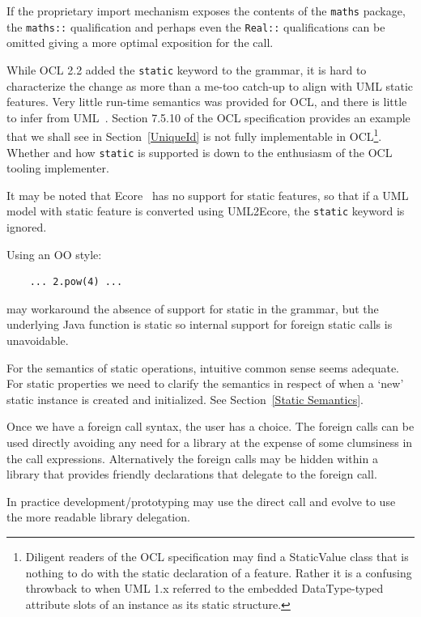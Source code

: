 \documentclass[sigconf]{acmart}
\begin{document}
If the proprietary import mechanism exposes the contents of the \verb|maths| package, the \verb|maths::| qualification and perhaps even the \verb|Real::| qualifications can be omitted giving a more optimal exposition for the call.

While OCL 2.2 added the \verb|static| keyword to the grammar, it is hard to characterize the change as more than a me-too catch-up to align with UML static features. Very little run-time semantics was provided for OCL, and there is little to infer from UML~\cite{UML-2.5.1}. Section 7.5.10 of the OCL specification provides an example that we shall see in Section~\ref{UniqueId} is not fully implementable in OCL\footnote{Diligent readers of the OCL specification may find a StaticValue class that is nothing to do with the static declaration of a feature. Rather it is a confusing throwback to when UML 1.x referred to the embedded DataType-typed attribute slots of an instance as its static structure.}. Whether and how \verb|static| is supported is down to the enthusiasm of the OCL tooling implementer.

It may be noted that Ecore~\cite{Eclipse-EMF} has no support for static features, so that if a UML model with static feature is converted using UML2Ecore, the \verb|static| keyword is ignored.

Using an OO style:

\begin{verbatim}
    ... 2.pow(4) ...
\end{verbatim} 

may workaround the absence of support for static in the grammar, but the underlying Java function is static so internal support for foreign static calls is unavoidable.

For the semantics of static operations, intuitive common sense seems adequate. For static properties we need to clarify the semantics in respect of when a `new' static instance is created and initialized. See Section~\ref{Static Semantics}.

Once we have a foreign call syntax, the user has a choice. The foreign calls can be used directly avoiding any need for a library at the expense of some clumsiness in the call expressions. Alternatively the foreign calls may be hidden within a library that provides friendly declarations that delegate to the foreign call.

In practice development/prototyping may use the direct call and evolve to use the more readable library delegation.
\end{document}

